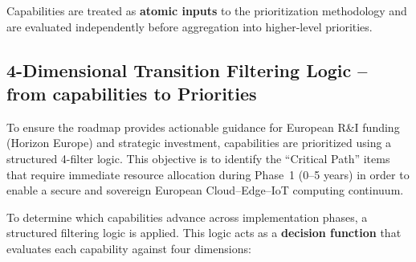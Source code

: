 \documentclass{ieeeaccess}
\begin{document}
Capabilities are treated as \textbf{atomic inputs} to the prioritization methodology and are evaluated independently before aggregation into higher-level priorities.


\subsection{4-Dimensional Transition Filtering Logic -- from capabilities to Priorities}

To ensure the roadmap provides actionable guidance for European R\&I funding (Horizon Europe) and strategic investment, capabilities are prioritized using a structured 4-filter logic. This objective is to identify the ``Critical Path''  items that require immediate resource allocation during
Phase~1 (0–5 years) in order to enable a secure and sovereign European
Cloud–Edge–IoT computing continuum.


To determine which capabilities advance across implementation phases, a structured filtering logic is applied. This logic acts as a \textbf{decision function} that evaluates each capability against four dimensions:
\end{document}
